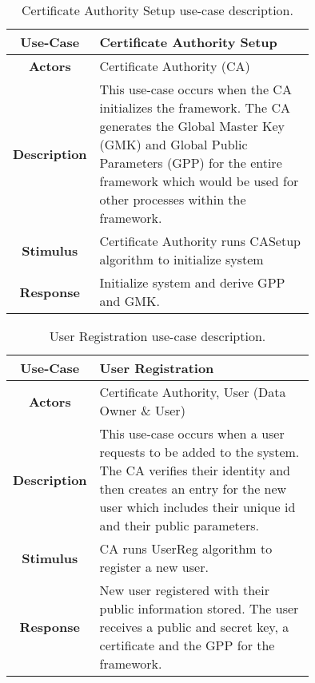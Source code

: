\begin{table}[]
	\centering
	\begin{tabular}{|c|p{0.75\linewidth}|}
		\hline
		\textbf{Use-Case}    & Certificate Authority Setup                                  \\ \hline
		\textbf{Actors}      & Certificate Authority (CA)                        \\ \hline
		\textbf{Description} & This use-case occurs when the CA initializes the framework. The CA generates the Global Master Key (GMK) and Global Public Parameters (GPP) for the entire framework which would be used for other processes within the framework. \\ \hline
		\textbf{Stimulus}    & Certificate Authority runs CASetup algorithm to initialize system                     \\ \hline
		\textbf{Response}    & Initialize system and derive GPP and GMK.             \\ \hline
	\end{tabular}
	\caption{Certificate Authority Setup use-case description.}
	\label{tab:use_case_casetup}
\end{table}

\begin{table}[]
	\centering
	\begin{tabular}{|c|p{0.75\linewidth}|}
		\hline
		\textbf{Use-Case}    & User Registration                                   \\ \hline
		\textbf{Actors}      & Certificate Authority, User (Data Owner \& User)                        \\ \hline
		\textbf{Description} & This use-case occurs when a user requests to be added to the system. The CA verifies their identity and then creates an entry for the new user which includes their unique id and their public parameters.  \\ \hline
		\textbf{Stimulus}    & CA runs UserReg algorithm to register a new user.                    \\ \hline
		\textbf{Response}    & New user registered with their public information stored. The user receives a public and secret key, a certificate and the GPP for the framework.             \\ \hline
	\end{tabular}
	\caption{User Registration use-case description.}
	\label{tab:use_case_userreg}
\end{table}

